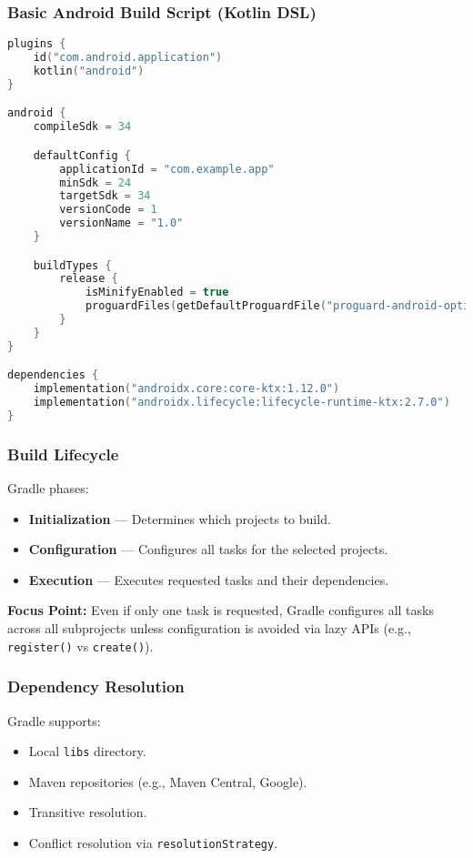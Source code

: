\documentclass[a4paper,12pt]{article}
\begin{document}
\subsubsection{Basic Android Build Script (Kotlin DSL)}

\begin{lstlisting}[language=Kotlin]
plugins {
    id("com.android.application")
    kotlin("android")
}

android {
    compileSdk = 34

    defaultConfig {
        applicationId = "com.example.app"
        minSdk = 24
        targetSdk = 34
        versionCode = 1
        versionName = "1.0"
    }

    buildTypes {
        release {
            isMinifyEnabled = true
            proguardFiles(getDefaultProguardFile("proguard-android-optimize.txt"))
        }
    }
}

dependencies {
    implementation("androidx.core:core-ktx:1.12.0")
    implementation("androidx.lifecycle:lifecycle-runtime-ktx:2.7.0")
}
\end{lstlisting}

\subsubsection{Build Lifecycle}

Gradle phases:

\begin{itemize}
  \item \textbf{Initialization} — Determines which projects to build.
  \item \textbf{Configuration} — Configures all tasks for the selected projects.
  \item \textbf{Execution} — Executes requested tasks and their dependencies.
\end{itemize}

\textbf{Focus Point:} Even if only one task is requested, Gradle configures all tasks across all subprojects unless configuration is avoided via lazy APIs (e.g., \texttt{register()} vs \texttt{create()}).

\subsubsection{Dependency Resolution}

Gradle supports:

\begin{itemize}
  \item Local \texttt{libs} directory.
  \item Maven repositories (e.g., Maven Central, Google).
  \item Transitive resolution.
  \item Conflict resolution via \texttt{resolutionStrategy}.
\end{itemize}
\end{document}
